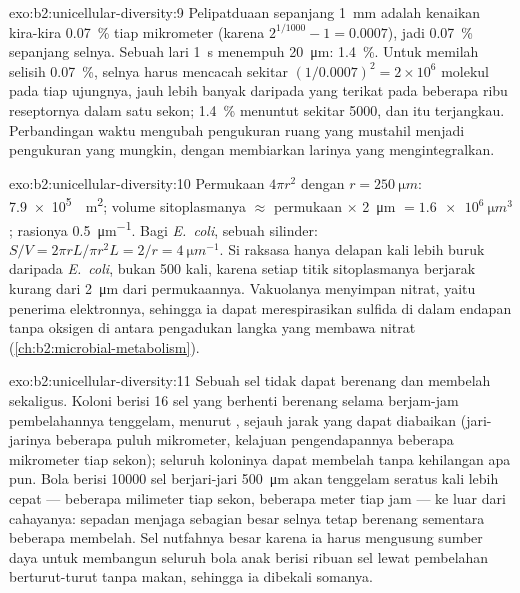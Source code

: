 \begin{solution}{exo:b2:unicellular-diversity:9}
Pelipatduaan sepanjang \qty{1}{mm} adalah kenaikan kira-kira
\qty{0.07}{\%} tiap mikrometer (karena $2^{1/1000} - 1 = 0.0007$),
jadi \qty{0.07}{\%} sepanjang selnya. Sebuah lari \qty{1}{s} menempuh
\qty{20}{\micro m}: \qty{1.4}{\%}. Untuk memilah selisih
\qty{0.07}{\%}, selnya harus mencacah sekitar $(1/0.0007)^2 = 2\times 10^6$ molekul
pada tiap ujungnya, jauh lebih banyak daripada yang
terikat pada beberapa ribu reseptornya dalam satu sekon; \qty{1.4}{\%}
menuntut sekitar \num{5000}, dan itu terjangkau. Perbandingan waktu
mengubah pengukuran ruang yang mustahil menjadi pengukuran yang
mungkin, dengan membiarkan larinya yang mengintegralkan.
\end{solution}

\begin{solution}{exo:b2:unicellular-diversity:10}
Permukaan $4\pi r^2$ dengan $r = \qty{250}{\micro m}$: \qty{7.9e5}{\micro
m^2}; volume sitoplasmanya $\approx$ permukaan $\times$ \qty{2}{\micro m}
$= \qty{1.6e6}{\micro m^3}$; rasionya \qty{0.5}{\micro m^{-1}}. Bagi
\emph{E.~coli}, sebuah silinder: $S/V = 2\pi r L/\pi r^2 L = 2/r =
\qty{4}{\micro m^{-1}}$. Si raksasa hanya delapan kali lebih buruk
daripada \emph{E.~coli}, bukan 500 kali, karena setiap titik
sitoplasmanya berjarak kurang dari \qty{2}{\micro m} dari permukaannya.
Vakuolanya menyimpan nitrat, yaitu penerima elektronnya, sehingga ia
dapat merespirasikan sulfida di dalam endapan tanpa oksigen di antara
pengadukan langka yang membawa nitrat
(\cref{ch:b2:microbial-metabolism}).
\end{solution}

\begin{solution}{exo:b2:unicellular-diversity:11}
Sebuah sel tidak dapat berenang dan membelah sekaligus. Koloni berisi
16 sel yang berhenti berenang selama berjam-jam pembelahannya
tenggelam, menurut , sejauh jarak yang dapat diabaikan
(jari-jarinya beberapa puluh mikrometer, kelajuan pengendapannya
beberapa mikrometer tiap sekon); seluruh koloninya dapat membelah
tanpa kehilangan apa pun. Bola berisi \num{10000} sel berjari-jari
\qty{500}{\micro m} akan tenggelam seratus kali lebih cepat ---
beberapa milimeter tiap sekon, beberapa meter tiap jam --- ke luar dari
cahayanya: sepadan menjaga sebagian besar selnya tetap berenang
sementara beberapa membelah. Sel nutfahnya besar karena ia harus
mengusung sumber daya untuk membangun seluruh bola anak berisi ribuan
sel lewat pembelahan berturut-turut tanpa makan, sehingga ia dibekali
somanya.
\end{solution}

